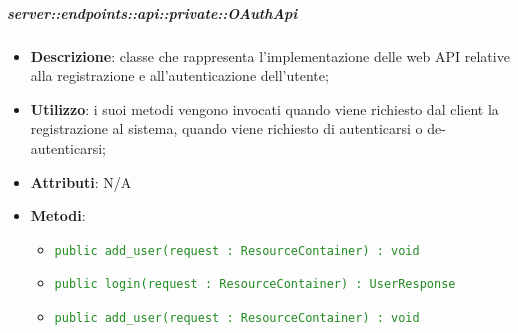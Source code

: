 
	\subparagraph{server::endpoints::api::private::OAuthApi} %
    \label{subp:bdsm_app_server_endpoints_api_private_oauthapi}
    \begin{itemize}
      	\item \textbf{Descrizione}: classe che rappresenta l'implementazione delle web API relative alla registrazione e all'autenticazione dell'utente;
      	\item \textbf{Utilizzo}: i suoi metodi vengono invocati quando viene richiesto dal client la registrazione al sistema, quando viene richiesto di autenticarsi o de-autenticarsi;
		\item \textbf{Attributi}: N/A
		\item \textbf{Metodi}:
    \begin{itemize}
        \item \textcolor{forestgreen}{\texttt{public add\_user(request : ResourceContainer) : void}}
        \item \textcolor{forestgreen}{\texttt{public login(request : ResourceContainer) : UserResponse}}
         \item \textcolor{forestgreen}{\texttt{public add\_user(request : ResourceContainer) : void}}
       \end{itemize}
    \end{itemize}


